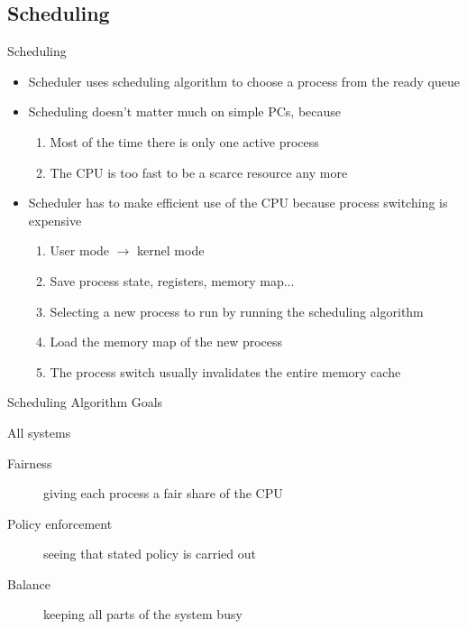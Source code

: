 \subsection{Scheduling}
\label{sec:scheduling}

\begin{frame}{Scheduling}
  \begin{itemize}
  \item \alert{Scheduler} uses \alert{scheduling algorithm} to choose a process from the ready
    queue
  \item Scheduling doesn't matter much on simple PCs, because
    \begin{enumerate}
    \item Most of the time there is only one active process
    \item The CPU is too fast to be a scarce resource any more
    \end{enumerate}
  \item Scheduler has to make efficient use of the CPU because process switching is expensive
    \begin{enumerate}
    \item User mode $\rightarrow{}$ kernel mode
    \item Save process state, registers, memory map...
    \item Selecting a new process to run by running the scheduling algorithm
    \item Load the memory map of the new process
    \item The process switch usually invalidates the entire memory cache
    \end{enumerate}
  \end{itemize}
\end{frame}

\begin{frame}{Scheduling Algorithm Goals}
  \begin{block}{All systems}
    \begin{description}
    \item[Fairness] giving each process a fair share of the CPU
    \item[Policy enforcement] seeing that stated policy is carried out
    \item[Balance] keeping all parts of the system busy
    \end{description}
  \end{block}
\end{frame}

